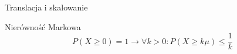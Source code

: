 \documentclass{mp}
\begin{document}
\begin{frame}{Translacja i skalowanie}
\begin{center}
\end{center}
\end{frame}

\begin{frame}{Nierówność Markowa}
\[ P(X\geq 0)=1 \to \forall k>0\colon P(X\geq k\mu)\leq \frac{1}{k} \]
\end{frame}

%
\end{document}
